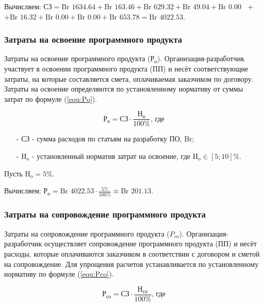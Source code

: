Вычисляем: $\text{СЗ} =
\text{Br } 1634.64
+ \text{Br } 163.46
+ \text{Br } 629.32
+ \text{Br } 49.04
+ \text{Br } 0.00
\text{ } +$
$+ \text{Br } 16.32
+ \text{Br } 0.00
+ \text{Br } 0.00
+ \text{Br } 653.78
= \text{Br } 4022.53$.

\subsubsection*{Затраты на освоение программного продукта}

Затраты на освоение программного продукта ($\text{Р}_\text{о}$).
Организация\/-\hspace{0pt}разработчик участвует в освоении программного продукта (ПП) и несёт соответствующие затраты,
на которые составляется смета, оплачиваемая заказчиком по договору.
Затраты на освоение определяются по установленному нормативу от суммы затрат по формуле (\ref{equ:Po}). 

\begin{equation}
    \label{equ:Po}
    \text{Р}_\text{о} = \text{СЗ} \cdot \frac{ \text{Н}_\text{о} }{ 100\% } \text{, где}
\end{equation}

\begin{enumerate}
    \item[-] $\text{СЗ}$ - сумма расходов по статьям на разработку ПО, Br; 
    \item[-] $\text{H}_\text{o}$ - установленный норматив затрат на освоение, где $\text{H}_\text{o} \in [5; 10]\%$.
\end{enumerate}

Пусть $\text{H}_\text{o} = 5\%$.

Вычисляем: $\text{Р}_\text{о} = \text{Br } 4022.53 \cdot \frac{ 5\% }{ 100\% } \approx \text{Br } 201.13$.

\subsubsection*{Затраты на сопровождение программного продукта}

Затраты на сопровождение программного продукта ($P_{co}$).
Организация\/-\hspace{0pt}разработчик осуществляет сопровождение программного продукта (ПП) и несёт расходы,
которые оплачиваются заказчиком в соответствии с договором и сметой на сопровождение.
Для упрощения расчетов устанавливается по установленному нормативу по формуле (\ref{equ:Pco}).

\begin{equation}
    \label{equ:Pco}
    \text{Р}_\text{со} = \text{СЗ} \cdot \frac{ \text{Н}_\text{со} }{ 100\% } \text{, где}
\end{equation}

